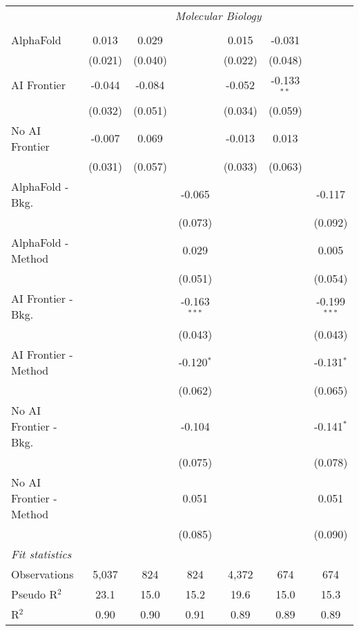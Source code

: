 \begin{tabular}{lcccccc}
 & \multicolumn{6}{c}{\textit{Molecular Biology}} \\ \\
   AlphaFold               & 0.013   & 0.029   &                & 0.015   & -0.031        &   \\   
                           & (0.021) & (0.040) &                & (0.022) & (0.048)       &   \\   
   AI Frontier             & -0.044  & -0.084  &                & -0.052  & -0.133$^{**}$ &   \\   
                           & (0.032) & (0.051) &                & (0.034) & (0.059)       &   \\   
   No AI Frontier          & -0.007  & 0.069   &                & -0.013  & 0.013         &   \\   
                           & (0.031) & (0.057) &                & (0.033) & (0.063)       &   \\   
   AlphaFold - Bkg.        &         &         & -0.065         &         &               & -0.117\\   
                           &         &         & (0.073)        &         &               & (0.092)\\   
   AlphaFold - Method      &         &         & 0.029          &         &               & 0.005\\   
                           &         &         & (0.051)        &         &               & (0.054)\\   
   AI Frontier - Bkg.      &         &         & -0.163$^{***}$ &         &               & -0.199$^{***}$\\   
                           &         &         & (0.043)        &         &               & (0.043)\\   
   AI Frontier - Method    &         &         & -0.120$^{*}$   &         &               & -0.131$^{*}$\\   
                           &         &         & (0.062)        &         &               & (0.065)\\   
   No AI Frontier - Bkg.   &         &         & -0.104         &         &               & -0.141$^{*}$\\   
                           &         &         & (0.075)        &         &               & (0.078)\\   
   No AI Frontier - Method &         &         & 0.051          &         &               & 0.051\\   
                           &         &         & (0.085)        &         &               & (0.090)\\   
   \midrule
   \emph{Fit statistics}\\
   Observations            & 5,037   & 824     & 824            & 4,372   & 674           & 674\\  
   Pseudo R$^2$            & 23.1    & 15.0    & 15.2           & 19.6    & 15.0          & 15.3\\  
   R$^2$                   & 0.90    & 0.90    & 0.91           & 0.89    & 0.89          & 0.89\\  
   

\end{tabular}
